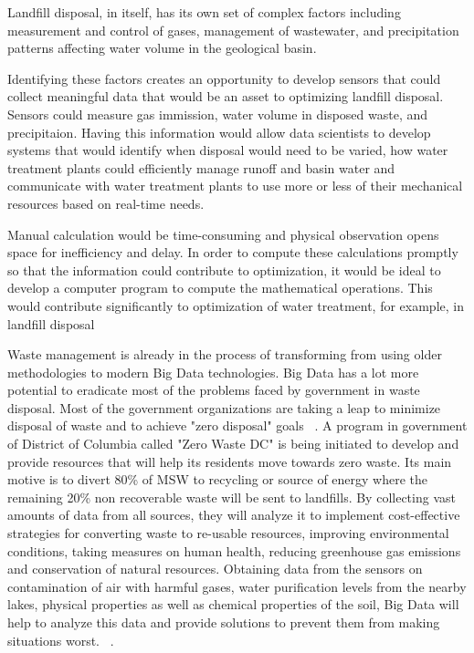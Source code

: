 \documentclass[sigconf]{acmart}
\begin{document}
Landfill disposal, in itself, has its own set of complex factors including measurement and control of gases, management of wastewater, and precipitation patterns affecting water volume in the geological basin.  

Identifying these factors creates an opportunity to develop sensors that could collect meaningful data that would be an asset to optimizing landfill disposal.  Sensors could measure gas immission, water volume in disposed waste, and precipitaion.  Having this information would allow data scientists to develop systems that would identify when disposal would need to be varied, how water treatment plants could efficiently manage runoff and basin water and communicate with water treatment plants to use more or less of their mechanical resources based on real-time needs. 

 Manual calculation would be time-consuming and physical observation opens space for inefficiency and delay.  In order to compute these calculations promptly so that the information could contribute to optimization, it would be ideal to develop a computer program to compute the mathematical operations.  This would contribute significantly to optimization of water treatment, for example, in landfill disposal ~\cite{akbarpour2016}

Waste management is already in the process of transforming from using older methodologies to modern Big Data technologies. Big Data has a lot more potential to eradicate most of the problems faced by government in waste disposal. Most of the government organizations are taking a leap to minimize disposal of waste and to achieve "zero disposal" goals~\cite{rosengren2017} . A program in government of District of Columbia called "Zero Waste DC" is being initiated to develop and provide resources that will help its residents move towards zero waste. Its main motive is to divert 80\% of MSW to recycling or source of energy where the remaining 20\% non recoverable waste will be sent to landfills. By collecting vast amounts of data from all sources, they will analyze it to implement cost-effective strategies for converting waste to re-usable resources, improving environmental conditions, taking measures on human health, reducing greenhouse gas emissions and conservation of natural resources. Obtaining data from the sensors on contamination of air with harmful gases, water purification levels from the nearby lakes, physical properties as well as chemical properties of the soil, Big Data will help to analyze this data and provide solutions to prevent them from making situations worst. ~\cite{rosengren2017}.
\end{document}
